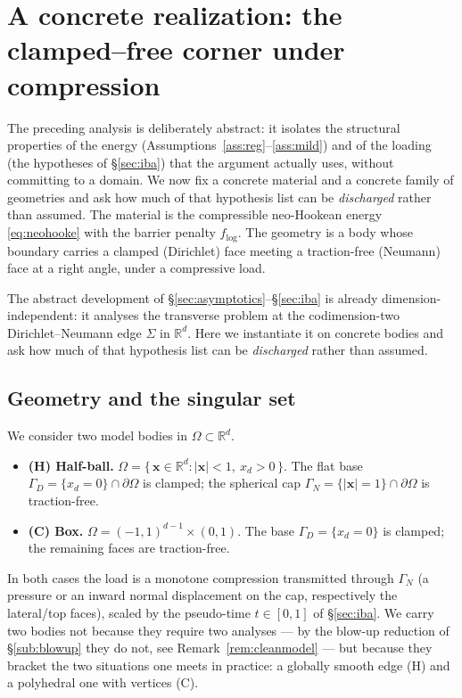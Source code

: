\section{A concrete realization: the clamped--free corner under compression}
\label{sec:concrete}

The preceding analysis is deliberately abstract: it isolates the structural properties of the energy
(Assumptions~\ref{ass:reg}--\ref{ass:mild}) and of the loading (the hypotheses of \S\ref{sec:iba}) that the argument
actually uses, without committing to a domain. We now fix a concrete material and a concrete family of geometries and
ask how much of that hypothesis list can be \emph{discharged} rather than assumed. The material is the compressible
neo-Hookean energy \eqref{eq:neohooke} with the barrier penalty $f_{\log}$. The geometry is a body whose boundary
carries a clamped (Dirichlet) face meeting a traction-free (Neumann) face at a right angle, under a compressive load.

The abstract development of \S\ref{sec:asymptotics}--\S\ref{sec:iba} is already dimension-independent: it analyses the
transverse problem at the codimension-two Dirichlet--Neumann edge $\Sigma$ in $\mathbb{R}^d$. Here we instantiate it on
concrete bodies and ask how much of that hypothesis list can be \emph{discharged} rather than assumed.

\subsection{Geometry and the singular set}
\label{sub:geom}

We consider two model bodies in $\Omega\subset\mathbb{R}^d$.

\begin{itemize}
    \item \textbf{(H) Half-ball.} $\Omega = \{\,\bm{x}\in\mathbb{R}^d : |\bm{x}|<1,\ x_d>0\,\}$. The flat base
          $\Gamma_D=\{x_d=0\}\cap\partial\Omega$ is clamped; the spherical cap $\Gamma_N=\{|\bm{x}|=1\}\cap\partial\Omega$ is
          traction-free.
    \item \textbf{(C) Box.} $\Omega=(-1,1)^{d-1}\times(0,1)$. The base $\Gamma_D=\{x_d=0\}$ is clamped; the remaining faces
          are traction-free.
\end{itemize}

In both cases the load is a monotone compression transmitted through $\Gamma_N$ (a pressure or an inward normal
displacement on the cap, respectively the lateral/top faces), scaled by the pseudo-time $t\in[0,1]$ of \S\ref{sec:iba}.
We carry two bodies not because they require two analyses --- by the blow-up reduction of \S\ref{sub:blowup} they do
not, see Remark~\ref{rem:cleanmodel} --- but because they bracket the two situations one meets in practice: a globally
smooth edge (H) and a polyhedral one with vertices (C).

